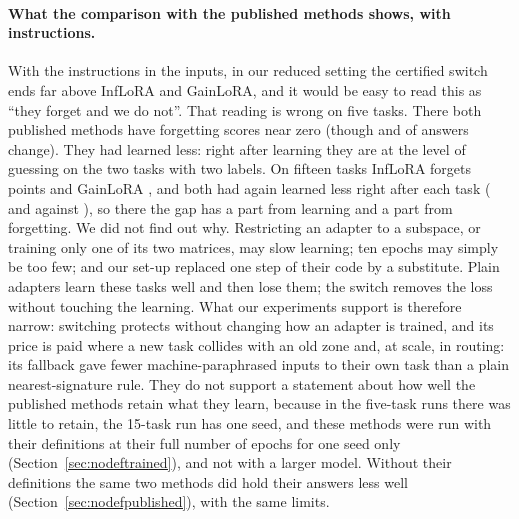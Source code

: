 \paragraph{What the comparison with the published methods shows, with instructions.} With the
instructions in the inputs, in our reduced setting the
certified switch ends far above InfLoRA and GainLoRA, and it would be easy to read this as ``they
forget and we do not''. That reading is wrong on five tasks. There both published methods have forgetting scores near zero (though \FiveInfChanged{} and \FiveGainChanged{} of \FiveInfCompared{} answers change). They had
learned less: right after learning they are at the level of guessing on the two tasks with two
labels. On fifteen tasks InfLoRA forgets \FifteenInfFT{} points and GainLoRA \FifteenGainFT{}, and
both had again learned less right after each task (\FifteenInfLearned{} and \FifteenGainLearned{}
against \FifteenCertLearned{}), so there the gap has a part from learning and a part from
forgetting. We did not find out why. Restricting an adapter to a subspace, or training only one of its
two matrices, may slow learning; ten epochs may simply be too few; and our set-up replaced one step
of their code by a substitute. Plain adapters learn these tasks well and then lose them; the switch
removes the loss without touching the learning. What our experiments support is therefore narrow:
switching protects without changing how an adapter is trained, and its price is paid where a new task collides with an old zone and, at scale, in routing: its fallback gave fewer machine-paraphrased inputs to their own task than a plain nearest-signature rule. They do not support a statement about how well the published
methods retain what they learn, because in the five-task runs there was little to retain, the
15-task run has one seed, and these methods were run with their definitions at their full
number of epochs for one seed only (Section~\ref{sec:nodeftrained}), and not with a larger model. Without their definitions the same two methods did hold their answers less well (Section~\ref{sec:nodefpublished}), with the same limits.

